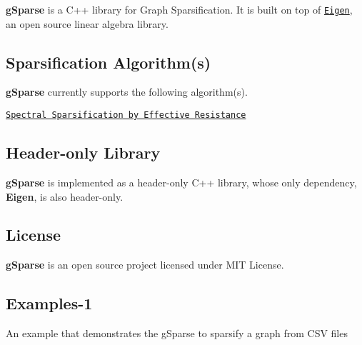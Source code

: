 {\bfseries g\+Sparse} is a C++ library for Graph Sparsification. It is built on top of \href{http://eigen.tuxfamily.org}{\tt Eigen}, an open source linear algebra library.

\subsection*{Sparsification Algorithm(s)}

{\bfseries g\+Sparse} currently supports the following algorithm(s).
\begin{DoxyItemize}
\item \href{https://arxiv.org/abs/0803.0929}{\tt Spectral Sparsification by Effective Resistance}
\end{DoxyItemize}

\subsection*{Header-\/only Library}

{\bfseries g\+Sparse} is implemented as a header-\/only C++ library, whose only dependency, {\bfseries Eigen}, is also header-\/only.

\subsection*{License}

{\bfseries g\+Sparse} is an open source project licensed under M\+IT License.

\subsection*{Examples-\/1}

An example that demonstrates the g\+Sparse to sparsify a graph from C\+SV files


